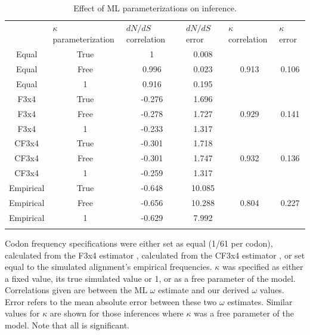 \documentclass[11pt]{article}
\begin{document}
\begin{table}[htbp]
\caption {\label{tab:mlspec}Effect of ML parameterizations on inference.}
\begin{tabular}{c c c c c c}
\hline\noalign{\smallskip}
\multicolumn{1}{l}{Codon frequencies} & \multicolumn{1}{l}{$\kappa$ parameterization} & \multicolumn{1}{l}{$dN/dS$ correlation} &\multicolumn{1}{l}{$dN/dS$ error} & \multicolumn{1}{l}{$\kappa$ correlation} &\multicolumn{1}{l}{$\kappa$ error} \\
Equal & True & 1 & 0.008 &   &   \\ 
Equal & Free & 0.996 & 0.023 & 0.913 & 0.106 \\ 
Equal & 1 & 0.916 & 0.195 &   &   \\ 
\hline\noalign{\smallskip}
F3x4 & True & -0.276 & 1.696 &   &   \\ 
F3x4 & Free & -0.278 & 1.727 & 0.929 & 0.141 \\ 
F3x4 & 1 & -0.233 & 1.317 &   &   \\ 
\hline\noalign{\smallskip}
CF3x4 & True & -0.301 & 1.718 &   &   \\ 
CF3x4 & Free & -0.301 & 1.747 & 0.932 & 0.136 \\ 
CF3x4 & 1 & -0.259 & 1.317 &   &   \\ 
\hline\noalign{\smallskip}
Empirical & True & -0.648 & 10.085 &   &   \\ 
Empirical & Free & -0.656 & 10.288 & 0.804 & 0.227 \\ 
Empirical & 1 & -0.629 & 7.992 &   &   \\ 
\noalign{\smallskip}\hline\noalign{\smallskip}
\end{tabular}
\newline
Codon frequency specifications were either set as equal (1/61 per codon), calculated from the F3x4 estimator \cite{MuseGaut1994}, calculated from the CF3x4 estimator \cite{Pond2010}, or set equal to the simulated alignment's empirical frequencies. $\kappa$ was specified as either a fixed value, its true simulated value or 1, or as a free parameter of the model. Correlations given are between the ML $\omega$ estimate and our derived $\omega$ values. Error refers to the mean absolute error between these two $\omega$ estimates. Similar values for $\kappa$ are shown for those inferences where $\kappa$ was a free parameter of the model. Note that all is significant.
\end{table}	
	
\end{document}
